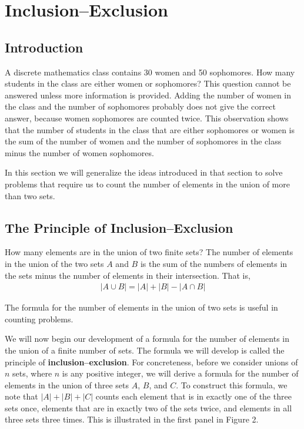 \documentclass[11pt]{article}
\begin{document}
\section{Inclusion–Exclusion}

\subsection{Introduction}

A discrete mathematics class contains 30 women and 50 sophomores. How many students in the class are either women or sophomores? This question cannot be answered unless more information is provided. Adding the number of women in the class and the number of sophomores probably does not give the correct answer, because women sophomores are counted twice. This observation shows that the number of students in the class that are either sophomores or women is the sum of the number of women and the number of sophomores in the class minus the number of women sophomores. 

In this section we will generalize the ideas introduced in that section to solve problems that require us to count the number of elements in the union of more than two sets.

\subsection{The Principle of Inclusion–Exclusion}

How many elements are in the union of two finite sets? The number of elements in the union of the two sets $A$ and $B$ is the sum of the numbers of elements in the sets minus the number of elements in their intersection. That is,
\begin{align*}
    |A \cup B| = |A| + |B| - |A \cap B|
\end{align*}

\noindent The formula for the number of elements in the union of two sets is useful in counting problems.


We will now begin our development of a formula for the number of elements in the union of a finite number of sets. The formula we will develop is called the principle of \textbf{inclusion–exclusion}. For concreteness, before we consider unions of $n$ sets, where $n$ is any positive integer, we will derive a formula for the number of elements in the union of three sets $A$, $B$, and $C$. To construct this formula, we note that $|A| + |B| + |C|$ counts each element that is in exactly one of the three sets once, elements that are in exactly two of the sets twice, and elements in all three sets three times. This is illustrated in the first panel in Figure 2.
\end{document}
